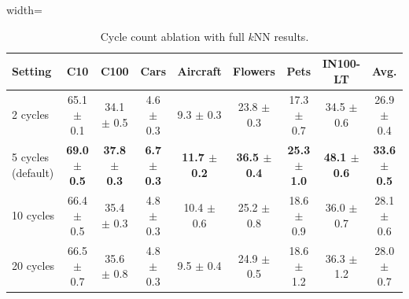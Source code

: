 \begin{table}[H]
\centering
\scriptsize
\setlength{\tabcolsep}{3.5pt}
\caption{Cycle count ablation with full $k$NN results.}
\label{tab:app_cycles_knn}
\begin{adjustbox}{width=\textwidth}
\begin{tabular}{l c c c c c c c c}
\toprule
Setting & C10 & C100 & Cars & Aircraft & Flowers & Pets & IN100-LT & Avg. \\
\midrule
2 cycles & 65.1 {\scriptsize$\pm$ 0.1} & 34.1 {\scriptsize$\pm$ 0.5} & 4.6 {\scriptsize$\pm$ 0.3} & 9.3 {\scriptsize$\pm$ 0.3} & 23.8 {\scriptsize$\pm$ 0.3} & 17.3 {\scriptsize$\pm$ 0.7} & 34.5 {\scriptsize$\pm$ 0.6} & 26.9 {\scriptsize$\pm$ 0.4} \\
5 cycles (default) & \textbf{69.0 {\scriptsize$\pm$ 0.5}} & \textbf{37.8 {\scriptsize$\pm$ 0.3}} & \textbf{6.7 {\scriptsize$\pm$ 0.3}} & \textbf{11.7 {\scriptsize$\pm$ 0.2}} & \textbf{36.5 {\scriptsize$\pm$ 0.4}} & \textbf{25.3 {\scriptsize$\pm$ 1.0}} & \textbf{48.1 {\scriptsize$\pm$ 0.6}} & \textbf{33.6 {\scriptsize$\pm$ 0.5}} \\
10 cycles & 66.4 {\scriptsize$\pm$ 0.5} & 35.4 {\scriptsize$\pm$ 0.3} & 4.8 {\scriptsize$\pm$ 0.3} & 10.4 {\scriptsize$\pm$ 0.6} & 25.2 {\scriptsize$\pm$ 0.8} & 18.6 {\scriptsize$\pm$ 0.9} & 36.0 {\scriptsize$\pm$ 0.7} & 28.1 {\scriptsize$\pm$ 0.6} \\
20 cycles & 66.5 {\scriptsize$\pm$ 0.7} & 35.6 {\scriptsize$\pm$ 0.8} & 4.8 {\scriptsize$\pm$ 0.3} & 9.5 {\scriptsize$\pm$ 0.4} & 24.9 {\scriptsize$\pm$ 0.5} & 18.6 {\scriptsize$\pm$ 1.2} & 36.3 {\scriptsize$\pm$ 1.2} & 28.0 {\scriptsize$\pm$ 0.7} \\
\bottomrule
\end{tabular}
\end{adjustbox}
\end{table}
